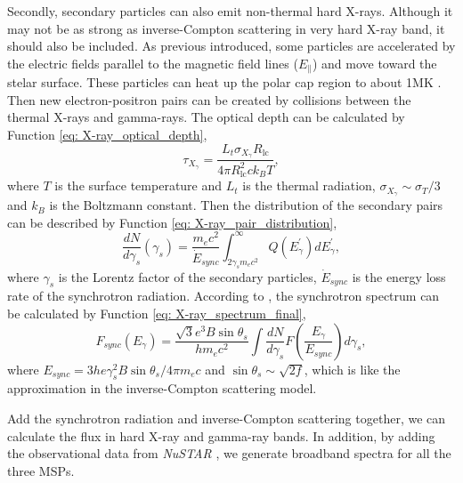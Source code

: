 \documentclass[a4paper, 12pt]{report}
\begin{document}
    Secondly, secondary particles can also emit non-thermal hard X-rays. Although it may 
    not be as strong as inverse-Compton scattering in very hard X-ray band, it should also 
    be included. As previous introduced, some particles are accelerated by the electric 
    fields parallel to the magnetic field lines ($E_{\parallel}$) and move toward the 
    stelar surface. These particles can heat up the polar cap region to about 1MK
    \citep{0004-637X-745-1-100}. Then new electron-positron pairs can be created by collisions
    between the thermal X-rays and gamma-rays. The optical depth can be calculated by 
    Function \ref{eq: X-ray_optical_depth}, 
    \begin{equation}
      \label{eq: X-ray_optical_depth}
      \tau_{X_{\gamma}} = \frac{L_{t} \sigma_{X_{\gamma}} R_{\text{lc}}}{4\pi R_{\text{lc}}^2 ck_{B}T} ,
    \end{equation}
    where $T$ is the surface temperature and
    $L_{t}$ is the thermal radiation, $\sigma_{X_{\gamma}} \sim \sigma_T / 3$ and 
    $k_B$ is the Boltzmann constant. Then the distribution of the secondary pairs can be 
    described by Function \ref{eq: X-ray_pair_distribution},
    \begin{equation}
      \label{eq: X-ray_pair_distribution}
      \frac{dN}{d\gamma_s} \left(\gamma_s\right) = \frac{m_e c^2}{\dot{E}_{sync}}\int_{2\gamma_s m_e c^2}^{\infty} Q\left(E_{\gamma}^{\prime}\right) dE_{\gamma}^{\prime} ,
    \end{equation}
    where $\gamma_s$ is the Lorentz
    factor of the secondary particles, $\dot{E}_{sync}$ is the energy loss rate of the 
    synchrotron radiation. According to \citet{0004-637X-787-2-167}, the synchrotron 
    spectrum can be calculated by Function \ref{eq: X-ray_spectrum_final},
    \begin{equation}
      \label{eq: X-ray_spectrum_final}
      F_{sync}\left(E_{\gamma}\right) = \frac{\sqrt{3}e^3B \sin{\theta_s}}{h m_e c^2} \int\frac{dN}{d\gamma_s} F\left(\frac{E_{\gamma}}{E_{sync}}\right)d\gamma_s ,
    \end{equation}
    where $E_{sync} = 3he\gamma_s^2B \sin{\theta_s}/4\pi m_e c$ and 
    $\sin{\theta_s}\sim\sqrt{2f}$, which is like the approximation in the inverse-Compton 
    scattering model.

    Add the synchrotron radiation and inverse-Compton scattering together, we can calculate
    the flux in hard X-ray and gamma-ray bands. In addition, by adding the observational data
    from \textit{NuSTAR} \citep{0004-637X-845-2-159}, we generate broadband spectra for all
    the three MSPs.
\end{document}
